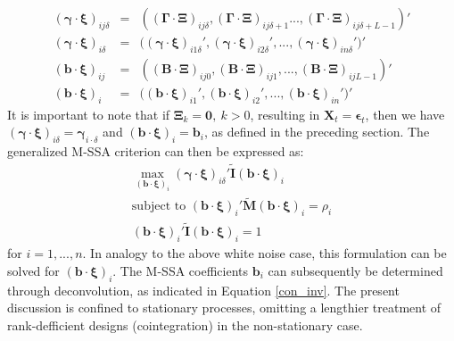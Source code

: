 \documentclass[11pt,a4paper]{article}
\begin{document}
\begin{eqnarray*}
(\boldsymbol{\gamma}\cdot\boldsymbol{\xi})_{ij\delta}&=&\left((\boldsymbol{\Gamma}\cdot\boldsymbol{\Xi})_{ij\delta},(\boldsymbol{\Gamma}\cdot\boldsymbol{\Xi})_{ ij\delta+1}...,(\boldsymbol{\Gamma}\cdot\boldsymbol{\Xi})_{ij\delta+L-1}\right)'\\
(\boldsymbol{\gamma}\cdot\boldsymbol{\xi})_{i\delta}&=&\Big((\boldsymbol{\gamma}\cdot\boldsymbol{\xi})_{i1\delta}',(\boldsymbol{\gamma}\cdot\boldsymbol{\xi})_{i2\delta}',...,(\boldsymbol{\gamma}\cdot\boldsymbol{\xi})_{in\delta}'\Big)'\\
(\mathbf{b}\cdot\boldsymbol{\xi})_{ij}&=&\left((\mathbf{B}\cdot\boldsymbol{\Xi})_{ ij0},(\mathbf{B}\cdot\boldsymbol{\Xi})_{ij1},...,(\mathbf{B}\cdot\boldsymbol{\Xi})_{ijL-1}\right)'\\
(\mathbf{b}\cdot\boldsymbol{\xi})_{i}&=&\Big((\mathbf{b}\cdot\boldsymbol{\xi})_{i1}',(\mathbf{b}\cdot\boldsymbol{\xi})_{i2}',...,(\mathbf{b}\cdot\boldsymbol{\xi})_{in}'\Big)'
\end{eqnarray*}
It is important to note that if $\boldsymbol{\Xi}_k=\mathbf{0},~k>0$, resulting in $\mathbf{X}_t=\boldsymbol{\epsilon}_t$, then we have $(\boldsymbol{\gamma}\cdot\boldsymbol{\xi})_{i\delta}=\boldsymbol{\gamma}_{i\cdot\delta}$ and $(\mathbf{b}\cdot\boldsymbol{\xi})_{i}=\mathbf{b}_i$, as defined in the preceding section. The generalized M-SSA criterion can then be expressed as: 
\begin{eqnarray}\label{gen_stat_x}
\max_{(\mathbf{b}\cdot\boldsymbol{\xi})_i} (\boldsymbol{\gamma}\cdot\boldsymbol{\xi})_{i\delta}'\mathbf{\tilde{I}} (\mathbf{b}\cdot\boldsymbol{\xi})_i\\
\textrm{subject~to~}(\mathbf{b}\cdot\boldsymbol{\xi})_i'\mathbf{\tilde{M}}(\mathbf{b}\cdot\boldsymbol{\xi})_i=\rho_i\nonumber\\
(\mathbf{b}\cdot\boldsymbol{\xi})_i'\mathbf{\tilde{I}}(\mathbf{b}\cdot\boldsymbol{\xi})_i=1\nonumber
\end{eqnarray}
for $i=1,...,n$. In analogy to the above white noise case, this formulation can be solved for $(\mathbf{b}\cdot\boldsymbol{\xi})_i$. The M-SSA coefficients $\mathbf{b}_i$ can subsequently be determined through deconvolution, as indicated in Equation \eqref{con_inv}. 
The present discussion is confined to stationary processes, omitting a lengthier treatment of rank-defficient designs (cointegration) in the non-stationary case.\\
\end{document}
